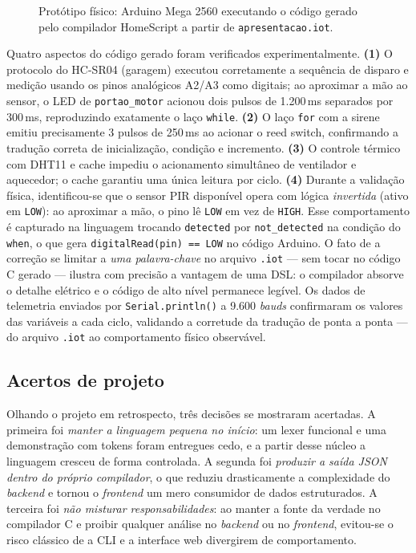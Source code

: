 \documentclass[conference]{IEEEtran}
\begin{document}
\begin{figure}[htbp]
\centerline{%
}
\caption{Protótipo físico: Arduino Mega 2560 executando o código gerado pelo compilador HomeScript a partir de \texttt{apresentacao.iot}.}
\label{fig:arduino}
\end{figure}

Quatro aspectos do código gerado foram verificados experimentalmente.
\textbf{(1)} O protocolo do HC-SR04 (garagem) executou corretamente a
sequência de disparo e medição usando os pinos analógicos A2/A3 como
digitais; ao aproximar a mão ao sensor, o LED de \texttt{portao\_motor}
acionou dois pulsos de 1.200\,ms separados por 300\,ms, reproduzindo
exatamente o laço \texttt{while}. \textbf{(2)} O laço \texttt{for} com a
sirene emitiu precisamente 3 pulsos de 250\,ms ao acionar o reed switch,
confirmando a tradução correta de inicialização, condição e incremento.
\textbf{(3)} O controle térmico com DHT11 e cache impediu o acionamento
simultâneo de ventilador e aquecedor; o cache garantiu uma única leitura
por ciclo. \textbf{(4)} Durante a validação física, identificou-se que o
sensor PIR disponível opera com lógica \emph{invertida} (ativo em
\texttt{LOW}): ao aproximar a mão, o pino lê \texttt{LOW} em vez de
\texttt{HIGH}. Esse comportamento é capturado na linguagem trocando
\texttt{detected} por \texttt{not\_detected} na condição do
\texttt{when}, o que gera \texttt{digitalRead(pin) == LOW} no código
Arduino. O fato de a correção se limitar a \emph{uma palavra-chave} no
arquivo \texttt{.iot} --- sem tocar no código C gerado --- ilustra com
precisão a vantagem de uma DSL: o compilador absorve o detalhe elétrico e
o código de alto nível permanece legível. Os dados de telemetria enviados
por \texttt{Serial.println()} a 9.600 \emph{bauds} confirmaram os valores
das variáveis a cada ciclo, validando a corretude da tradução de ponta a
ponta --- do arquivo \texttt{.iot} ao comportamento físico observável.

\subsection{Acertos de projeto}

Olhando o projeto em retrospecto, três decisões se mostraram acertadas. A
primeira foi \emph{manter a linguagem pequena no início}: um lexer
funcional e uma demonstração com tokens foram entregues cedo, e a partir
desse núcleo a linguagem cresceu de forma controlada. A segunda foi
\emph{produzir a saída JSON dentro do próprio compilador}, o que reduziu
drasticamente a complexidade do \emph{backend} e tornou o \emph{frontend}
um mero consumidor de dados estruturados. A terceira foi \emph{não misturar
responsabilidades}: ao manter a fonte da verdade no compilador C e proibir
qualquer análise no \emph{backend} ou no \emph{frontend}, evitou-se o risco
clássico de a CLI e a interface web divergirem de comportamento.
\end{document}
